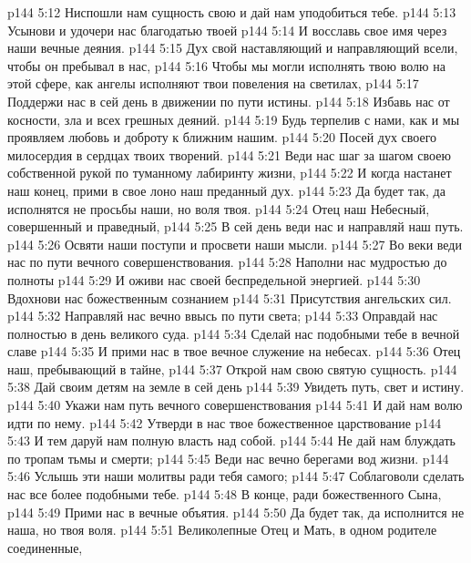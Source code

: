 \vs p144 5:12 \hsetoff Ниспошли нам сущность свою и дай нам уподобиться тебе.
\vs p144 5:13 Усынови и удочери нас благодатью твоей
\vs p144 5:14 \hsetoff И восславь свое имя через наши вечные деяния.
\vs p144 5:15 Дух свой наставляющий и направляющий всели, чтобы он пребывал в нас,
\vs p144 5:16 \hsetoff Чтобы мы могли исполнять твою волю на этой сфере, как ангелы исполняют твои повеления на светилах,
\vs p144 5:17 Поддержи нас в сей день в движении по пути истины.
\vs p144 5:18 \hsetoff Избавь нас от косности, зла и всех грешных деяний.
\vs p144 5:19 Будь терпелив с нами, как и мы проявляем любовь и доброту к ближним нашим.
\vs p144 5:20 \hsetoff Посей дух своего милосердия в сердцах твоих творений.
\vs p144 5:21 Веди нас шаг за шагом своею собственной рукой по туманному лабиринту жизни,
\vs p144 5:22 \hsetoff И когда настанет наш конец, прими в свое лоно наш преданный дух.
\vs p144 5:23 Да будет так, да исполнятся не просьбы наши, но воля твоя.
\separatorline
\vs p144 5:24 Отец наш Небесный, совершенный и праведный,
\vs p144 5:25 \hsetoff В сей день веди нас и направляй наш путь.
\vs p144 5:26 Освяти наши поступи и просвети наши мысли.
\vs p144 5:27 \hsetoff Во веки веди нас по пути вечного совершенствования.
\vs p144 5:28 Наполни нас мудростью до полноты
\vs p144 5:29 \hsetoff И оживи нас своей беспредельной энергией.
\vs p144 5:30 Вдохнови нас божественным сознанием
\vs p144 5:31 \hsetoff Присутствия ангельских сил.
\vs p144 5:32 Направляй нас вечно ввысь по пути света;
\vs p144 5:33 \hsetoff Оправдай нас полностью в день великого суда.
\vs p144 5:34 Сделай нас подобными тебе в вечной славе
\vs p144 5:35 \hsetoff И прими нас в твое вечное служение на небесах.
\separatorline
\vs p144 5:36 Отец наш, пребывающий в тайне,
\vs p144 5:37 \hsetoff Открой нам свою святую сущность.
\vs p144 5:38 Дай своим детям на земле в сей день
\vs p144 5:39 \hsetoff Увидеть путь, свет и истину.
\vs p144 5:40 Укажи нам путь вечного совершенствования
\vs p144 5:41 \hsetoff И дай нам волю идти по нему.
\vs p144 5:42 Утверди в нас твое божественное царствование
\vs p144 5:43 \hsetoff И тем даруй нам полную власть над собой.
\vs p144 5:44 Не дай нам блуждать по тропам тьмы и смерти;
\vs p144 5:45 \hsetoff Веди нас вечно берегами вод жизни.
\vs p144 5:46 Услышь эти наши молитвы ради тебя самого;
\vs p144 5:47 \hsetoff Соблаговоли сделать нас все более подобными тебе.
\vs p144 5:48 В конце, ради божественного Сына,
\vs p144 5:49 \hsetoff Прими нас в вечные объятия.
\vs p144 5:50 Да будет так, да исполнится не наша, но твоя воля.
\separatorline
\vs p144 5:51 Великолепные Отец и Мать, в одном родителе соединенные,
